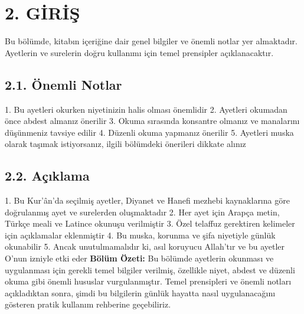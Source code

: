 \documentclass[12pt,a4paper]{article}
\begin{document}
\section{2. GİRİŞ}
Bu bölümde, kitabın içeriğine dair genel bilgiler ve önemli notlar yer almaktadır. Ayetlerin ve surelerin doğru kullanımı için temel prensipler açıklanacaktır.
\subsection{2.1. Önemli Notlar}
1. Bu ayetleri okurken niyetinizin halis olması önemlidir
2. Ayetleri okumadan önce abdest almanız önerilir
3. Okuma sırasında konsantre olmanız ve manalarını düşünmeniz tavsiye edilir
4. Düzenli okuma yapmanız önerilir
5. Ayetleri muska olarak taşımak istiyorsanız, ilgili bölümdeki önerileri dikkate alınız
\subsection{2.2. Açıklama}
1. Bu Kur'ân'da seçilmiş ayetler, Diyanet ve Hanefi mezhebi kaynaklarına göre doğrulanmış ayet ve surelerden oluşmaktadır
2. Her ayet için Arapça metin, Türkçe meali ve Latince okunuşu verilmiştir
3. Özel telaffuz gerektiren kelimeler için açıklamalar eklenmiştir
4. Bu muska, korunma ve şifa niyetiyle günlük okunabilir
5. Ancak unutulmamalıdır ki, asıl koruyucu Allah'tır ve bu ayetler O'nun izniyle etki eder
\textbf{Bölüm Özeti:}
Bu bölümde ayetlerin okunması ve uygulanması için gerekli temel bilgiler verilmiş, özellikle niyet, abdest ve düzenli okuma gibi önemli hususlar vurgulanmıştır.
Temel prensipleri ve önemli notları açıkladıktan sonra, şimdi bu bilgilerin günlük hayatta nasıl uygulanacağını gösteren pratik kullanım rehberine geçebiliriz.
\end{document}
